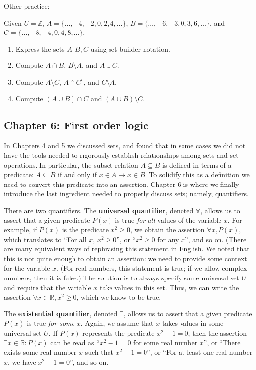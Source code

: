 \documentclass[letterpaper,12pt]{article}
\newcommand{\R}{\mathbb{R}}
\begin{document}
Other practice:

Given $U=\mathbb{Z}$, $A = \{\ldots, -4, -2, 0, 2, 4, \ldots\}$, $B = \{\ldots, -6, -3, 0, 3, 6, \ldots\}$, and $C = \{\ldots, -8, -4, 0, 4, 8, \ldots\}$,
\begin{enumerate}
\item Express the sets $A,B,C$ using set builder notation.
\item Compute $A\cap B$, $B\setminus A$, and $A\cup C$.
\item Compute $A\setminus C$, $A\cap C^c$, and $C\setminus A$.
\item Compute $(A\cup B)\cap C$ and $(A\cup B)\setminus C$.
\end{enumerate}
\subsection*{Chapter 6: First order logic}
In Chapters 4 and 5 we discussed sets, and found that in some cases we did not have the tools needed to rigorously establish relationships among sets and set operations. In particular, the subset relation $A\subseteq B$ is defined in terms of a predicate: $A\subseteq B$ if and only if $x\in A\to x\in B$. To solidify this as a definition we need to convert this predicate into an assertion. Chapter 6 is where we finally introduce the last ingredient needed to properly discuss sets; namely, quantifiers.

There are two quantifiers. The {\bf universal quantifier}, denoted $\forall$, allows us to assert that a given predicate $P(x)$ is true {\em for all} values of the variable $x$. For example, if $P(x)$ is the predicate $x^2\geq 0$, we obtain the assertion $\forall x, P(x)$, which translates to ``For all $x$, $x^2\geq 0$'', or ``$x^2\geq 0$ for any $x$'', and so on. (There are many equivalent ways of rephrasing this statement in English. We noted that this is not quite enough to obtain an assertion: we need to provide some context for the variable $x$. (For real numbers, this statement is true; if we allow complex numbers, then it is false.) The solution is to always specify some universal set $U$ and require that the variable $x$ take values in this set. Thus, we can write the assertion $\forall x\in\R, x^2\geq 0$, which we know to be true.

The {\bf existential quantifier}, denoted $\exists$, allows us to assert that a given predicate $P(x)$ is true {\em for some} $x$. Again, we assume that $x$ takes values in some universal set $U$. If $P(x)$ represents the predicate $x^2-1=0$, then the assertion $\exists x\in\R : P(x)$ can be read as ``$x^2-1=0$ for some real number $x$'', or ``There exists some real number $x$ such that $x^2-1=0$'', or ``For at least one real number $x$, we have $x^2-1=0$'', and so on.
\end{document}
